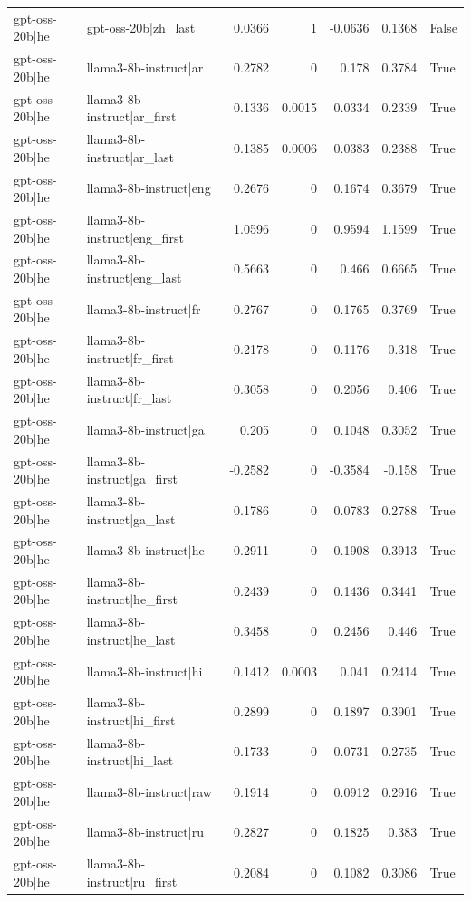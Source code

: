 \begin{table}
\begin{tabular}{l l r r r r l}
gpt-oss-20b|he & gpt-oss-20b|zh_last & 0.0366 & 1 & -0.0636 & 0.1368 & False \\
gpt-oss-20b|he & llama3-8b-instruct|ar & 0.2782 & 0 & 0.178 & 0.3784 & True \\
gpt-oss-20b|he & llama3-8b-instruct|ar_first & 0.1336 & 0.0015 & 0.0334 & 0.2339 & True \\
gpt-oss-20b|he & llama3-8b-instruct|ar_last & 0.1385 & 0.0006 & 0.0383 & 0.2388 & True \\
gpt-oss-20b|he & llama3-8b-instruct|eng & 0.2676 & 0 & 0.1674 & 0.3679 & True \\
gpt-oss-20b|he & llama3-8b-instruct|eng_first & 1.0596 & 0 & 0.9594 & 1.1599 & True \\
gpt-oss-20b|he & llama3-8b-instruct|eng_last & 0.5663 & 0 & 0.466 & 0.6665 & True \\
gpt-oss-20b|he & llama3-8b-instruct|fr & 0.2767 & 0 & 0.1765 & 0.3769 & True \\
gpt-oss-20b|he & llama3-8b-instruct|fr_first & 0.2178 & 0 & 0.1176 & 0.318 & True \\
gpt-oss-20b|he & llama3-8b-instruct|fr_last & 0.3058 & 0 & 0.2056 & 0.406 & True \\
gpt-oss-20b|he & llama3-8b-instruct|ga & 0.205 & 0 & 0.1048 & 0.3052 & True \\
gpt-oss-20b|he & llama3-8b-instruct|ga_first & -0.2582 & 0 & -0.3584 & -0.158 & True \\
gpt-oss-20b|he & llama3-8b-instruct|ga_last & 0.1786 & 0 & 0.0783 & 0.2788 & True \\
gpt-oss-20b|he & llama3-8b-instruct|he & 0.2911 & 0 & 0.1908 & 0.3913 & True \\
gpt-oss-20b|he & llama3-8b-instruct|he_first & 0.2439 & 0 & 0.1436 & 0.3441 & True \\
gpt-oss-20b|he & llama3-8b-instruct|he_last & 0.3458 & 0 & 0.2456 & 0.446 & True \\
gpt-oss-20b|he & llama3-8b-instruct|hi & 0.1412 & 0.0003 & 0.041 & 0.2414 & True \\
gpt-oss-20b|he & llama3-8b-instruct|hi_first & 0.2899 & 0 & 0.1897 & 0.3901 & True \\
gpt-oss-20b|he & llama3-8b-instruct|hi_last & 0.1733 & 0 & 0.0731 & 0.2735 & True \\
gpt-oss-20b|he & llama3-8b-instruct|raw & 0.1914 & 0 & 0.0912 & 0.2916 & True \\
gpt-oss-20b|he & llama3-8b-instruct|ru & 0.2827 & 0 & 0.1825 & 0.383 & True \\
gpt-oss-20b|he & llama3-8b-instruct|ru_first & 0.2084 & 0 & 0.1082 & 0.3086 & True \\

\end{tabular}
\end{table}

